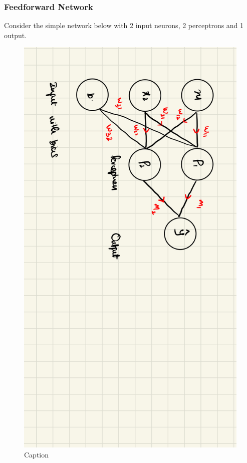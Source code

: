 \subsubsection{Feedforward Network}
Consider the simple network below with 2 input neurons, 2 perceptrons and 1 output.\\
\begin{figure}[!h]
  \centering
  \includegraphics[scale=0.1]{CHAPTER_2/c2_fig_neural_network_2.jpeg}
  \caption{Caption}
  \label{neural_network_2}
\end{figure}
